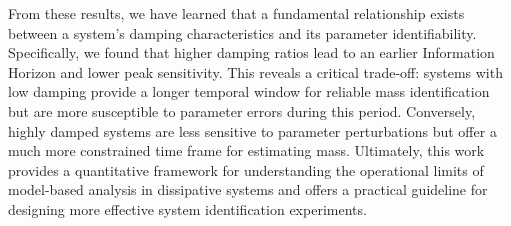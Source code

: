\documentclass[]{article}
\begin{document}
From these results, we have learned that a fundamental relationship exists between a system's damping characteristics and its parameter identifiability. Specifically, we found that higher damping ratios lead to an earlier Information Horizon and lower peak sensitivity. This reveals a critical trade-off: systems with low damping provide a longer temporal window for reliable mass identification but are more susceptible to parameter errors during this period. Conversely, highly damped systems are less sensitive to parameter perturbations but offer a much more constrained time frame for estimating mass. Ultimately, this work provides a quantitative framework for understanding the operational limits of model-based analysis in dissipative systems and offers a practical guideline for designing more effective system identification experiments.


{}

\end{document}
